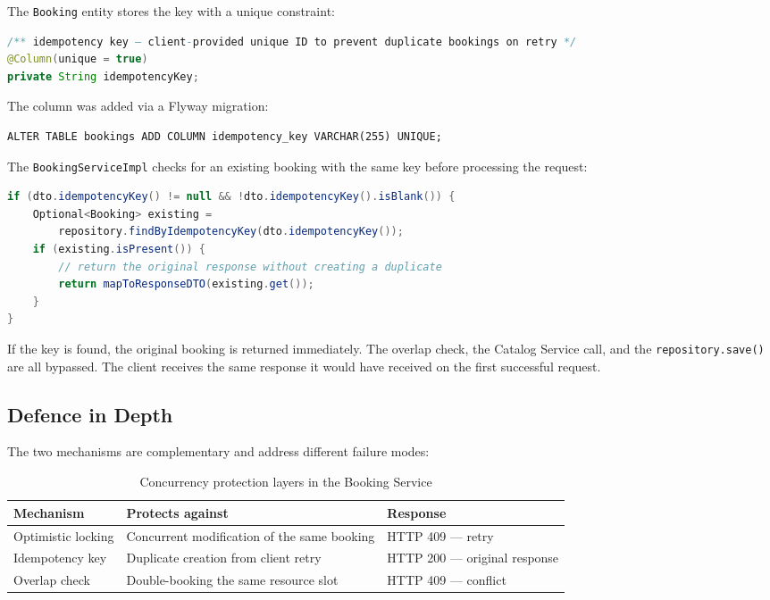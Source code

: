 The \texttt{Booking} entity stores the key with a unique constraint:

\begin{lstlisting}[style=javastyle, language=Java, caption={Idempotency key field in Booking entity}]
/** idempotency key — client-provided unique ID to prevent duplicate bookings on retry */
@Column(unique = true)
private String idempotencyKey;
\end{lstlisting}

The column was added via a Flyway migration:

\begin{lstlisting}[style=sqlstyle, caption={V3\_\_add\_idempotency\_key\_to\_bookings.sql}]
ALTER TABLE bookings ADD COLUMN idempotency_key VARCHAR(255) UNIQUE;
\end{lstlisting}

The \texttt{BookingServiceImpl} checks for an existing booking with the same key before processing the request:

\begin{lstlisting}[style=javastyle, language=Java, caption={Idempotency check in BookingServiceImpl}]
if (dto.idempotencyKey() != null && !dto.idempotencyKey().isBlank()) {
    Optional<Booking> existing =
        repository.findByIdempotencyKey(dto.idempotencyKey());
    if (existing.isPresent()) {
        // return the original response without creating a duplicate
        return mapToResponseDTO(existing.get());
    }
}
\end{lstlisting}

If the key is found, the original booking is returned immediately. The overlap check, the Catalog Service call, and the \texttt{repository.save()} are all bypassed. The client receives the same response it would have received on the first successful request.

\subsection{Defence in Depth}

The two mechanisms are complementary and address different failure modes:

\begin{table}[H]
\centering
\begin{tabular}{lll}
\toprule
\textbf{Mechanism} & \textbf{Protects against} & \textbf{Response} \\
\midrule
Optimistic locking & Concurrent modification of the same booking & HTTP 409 --- retry \\
Idempotency key & Duplicate creation from client retry & HTTP 200 --- original response \\
Overlap check & Double-booking the same resource slot & HTTP 409 --- conflict \\
\bottomrule
\end{tabular}
\caption{Concurrency protection layers in the Booking Service}
\end{table}

